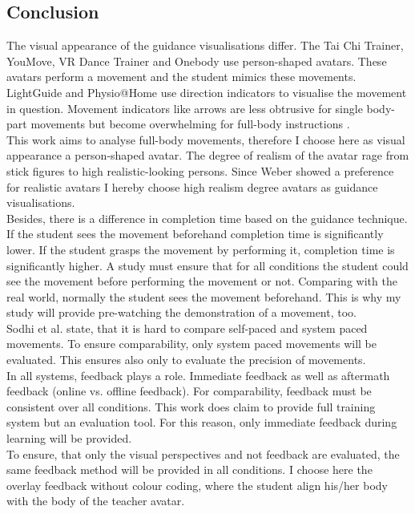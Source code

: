 \subsection{Conclusion}
The visual appearance of the guidance visualisations differ. The Tai Chi Trainer, YouMove, VR Dance Trainer and Onebody use person-shaped avatars. These avatars perform a movement and the student mimics these movements. LightGuide and Physio@Home use direction indicators to visualise the movement in question. Movement indicators like arrows are less obtrusive for single body-part movements but become overwhelming for full-body instructions \cite{Sodhi2012}.\\
This work aims to analyse full-body movements, therefore I choose here as visual appearance a person-shaped avatar. The degree of realism of the avatar rage from stick figures to high realistic-looking persons. Since Weber \cite{Weber2018} showed a preference for realistic avatars I hereby choose high realism degree avatars as guidance visualisations.\\
Besides, there is a difference in completion time based on the guidance technique. If the student sees the movement beforehand completion time is significantly lower. If the student grasps the movement by performing it, completion time is significantly higher. A study must ensure that for all conditions the student could see the movement before performing the movement or not. Comparing with the real world, normally the student sees the movement beforehand. This is why my study will provide pre-watching the demonstration of a movement, too.\\
Sodhi et al. state, that it is hard to compare self-paced and system paced movements. To ensure comparability, only system paced movements will be evaluated. This ensures also only to evaluate the precision of movements.\\
In all systems, feedback plays a role. Immediate feedback as well as aftermath feedback (online vs. offline feedback). For comparability, feedback must be consistent over all conditions. This work does claim to provide full training system but an evaluation tool. For this reason, only immediate feedback during learning will be provided.\\
To ensure, that only the visual perspectives and not feedback are evaluated, the same feedback method will be provided in all conditions. I choose here the overlay feedback without colour coding, where the student align his/her body with the body of the teacher avatar.\\
